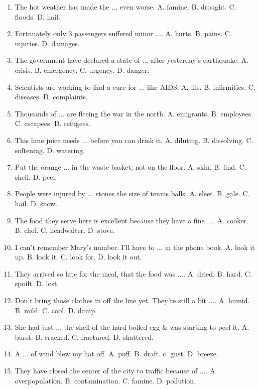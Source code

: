 \documentclass{article}
\numberwithin{equation}{section}
\begin{document}
\begin{enumerate}[leftmargin=2mm]
	\item The hot weather has made the $\ldots$ even worse. {\sf A.} famine. {\sf B.} drought. {\sf C.} floods. {\sf D.} hail.
	\item Fortunately only 3 passengers suffered minor $\ldots$. {\sf A.} hurts. {\sf B.} pains. {\sf C.} injuries. {\sf D.} damages.
	\item The government have declared a state of $\ldots$ after yesterday's earthquake. {\sf A.} crisis. {\sf B.} emergency. {\sf C.} urgency. {\sf D.} danger.
	\item Scientists are working to find a cure for $\ldots$ like AIDS. {\sf A.} ills. {\sf B.} infirmities. {\sf C.} diseases. {\sf D.} complaints.
	\item Thousands of $\ldots$ are fleeing the war in the north. {\sf A.} emigrants. {\sf B.} employees. {\sf C.} escapees. {\sf D.} refugees.
	\item This lime juice needs $\ldots$ before you can drink it. {\sf A.} diluting. {\sf B.} dissolving. {\sf C.} softening. {\sf D.} watering.
	\item Put the orange $\ldots$ in the waste basket, not on the floor. {\sf A.} skin. {\sf B.} find. {\sf C.} shell. {\sf D.} peel.
	\item People were injured by $\ldots$ stones the size of tennis balls. {\sf A.} sleet. {\sf B.} gale. {\sf C.} hail. {\sf D.} snow.
	\item The food they serve here is excellent because they have a fine $\ldots$. {\sf A.} cooker. {\sf B.} chef. {\sf C.} headwaiter. {\sf D.} stove.
	\item I can't remember Mary's number. I'll have to $\ldots$ in the phone book. {\sf A.} look it up. {\sf B.} look it. {\sf C.} look for. {\sf D.} look it out.
	\item They arrived so late for the meal, that the food was $\ldots$. {\sf A.} dried. {\sf B.} hard. {\sf C.} spoilt. {\sf D.} lost.
	\item Don't bring those clothes in off the line yet. They're still a bit $\ldots$. {\sf A.} humid. {\sf B.} mild. {\sf C.} cool. {\sf D.} damp.
	\item She had just $\ldots$ the shell of the hard-boiled egg \& was starting to peel it. {\sf A.} burst. {\sf B.} cracked. {\sf C.} fractured. {\sf D.} shattered.
	\item A $\ldots$ of wind blew my hat off. {\sf A.} puff. {\sf B.} draft. c. gust. {\sf D.} breeze.
	\item They have closed the center of the city to traffic because of $\ldots$. {\sf A.} overpopulation. {\sf B.} contamination. {\sf C.} famine. {\sf D.} pollution.

\end{enumerate}
\end{document}
